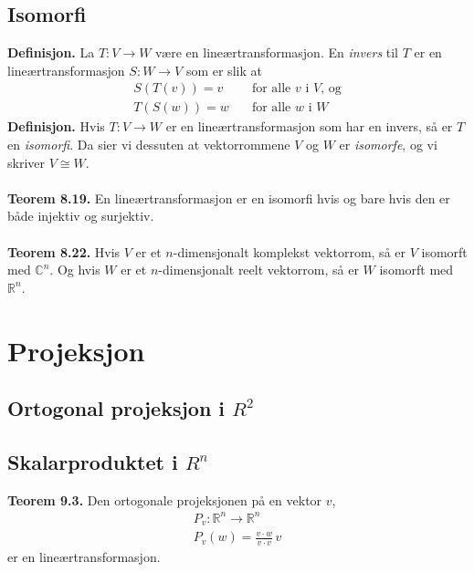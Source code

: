 \documentclass{article}
\begin{document}
\subsection{Isomorfi}
\textbf{Definisjon.} La $T: V \rightarrow W$ være en lineærtransformasjon. En \textit{invers} til $T$ er en lineærtransformasjon $S: W \rightarrow V$ som er slik at
\begin{align*}
    S(T(v)) = v \quad &\text{for alle } v \text{ i } V \text{, og} \\
    T(S(w)) = w \quad &\text{for alle } w \text{ i } W
\end{align*}
\textbf{Definisjon.} Hvis $T: V \rightarrow W$ er en lineærtransformasjon som har en invers, så er $T$ en \textit{isomorfi}. Da sier vi dessuten at vektorrommene $V$ og $W$ er \textit{isomorfe}, og vi skriver $V \cong W$.
\\\\
\textbf{Teorem 8.19.} En lineærtransformasjon er en isomorfi hvis og bare hvis den er både injektiv og surjektiv.
\\\\
\textbf{Teorem 8.22.} Hvis $V$ er et $n$-dimensjonalt komplekst vektorrom, så er $V$ isomorft med $\mathbb{C}^n$. Og hvis $W$ er et $n$-dimensjonalt reelt vektorrom, så er $W$ isomorft med $\mathbb{R}^n$.




\clearpage
\section{Projeksjon}

\subsection{Ortogonal projeksjon i $R^2$}
\subsection{Skalarproduktet i $R^n$}
\textbf{Teorem 9.3.} Den ortogonale projeksjonen på en vektor $v$,
\begin{gather*}
    P_v : \mathbb{R}^n \rightarrow \mathbb{R}^n \\
    P_v(w)=\frac{v \cdot w}{v \cdot v}\,v
\end{gather*}
er en lineærtransformasjon.
\end{document}
